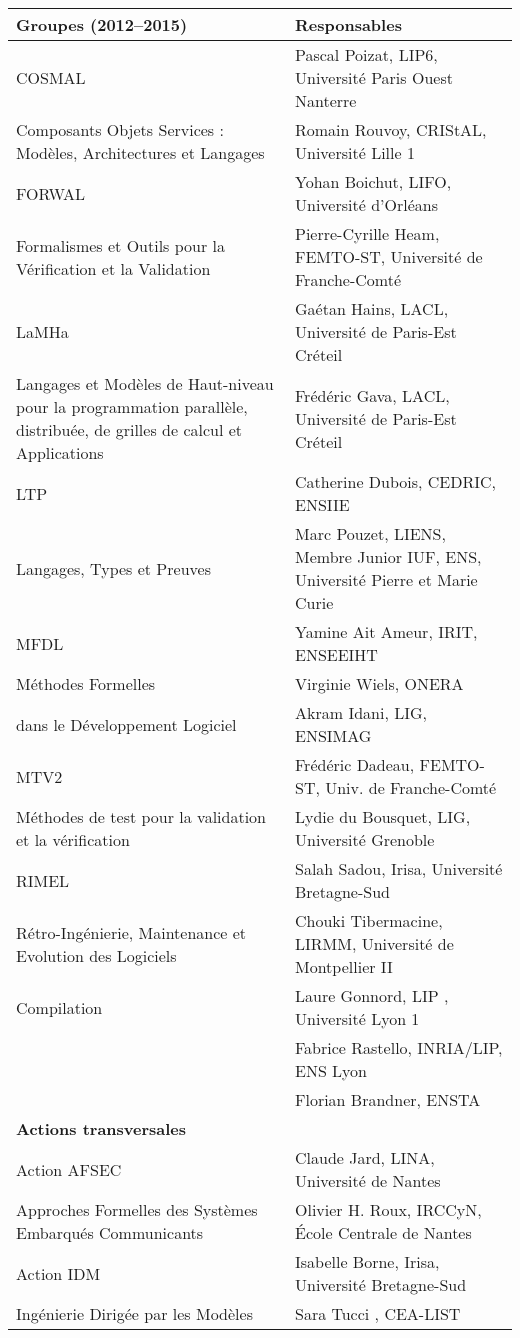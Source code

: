 \documentclass[11pt]{article}
\begin{document}
{	\centering
\begin{tabular}{|p{6cm}p{8.5cm}|}
\hline
\bf Groupes (2012--2015) & \bf Responsables \\
\hline
COSMAL & Pascal Poizat, LIP6, Université Paris Ouest Nanterre \\
\footnotesize Composants Objets Services : Modèles, Architectures et Langages  & Romain Rouvoy, CRIStAL, Université Lille 1\\

FORWAL & Yohan Boichut, LIFO, Université d'Orléans\\
\footnotesize  Formalismes et Outils pour la Vérification et la Validation  & Pierre-Cyrille Heam, FEMTO-ST, Université de Franche-Comté \\

LaMHa & Gaétan Hains, LACL, Université de Paris-Est Créteil \\
\footnotesize Langages et Modèles de Haut-niveau pour la programmation parallèle, distribuée, de grilles de calcul et Applications & Frédéric Gava, LACL, Université de Paris-Est Créteil \\

LTP & Catherine Dubois, CEDRIC, ENSIIE\\
\footnotesize Langages, Types et Preuves & Marc Pouzet, LIENS, Membre Junior IUF, ENS, Université Pierre et Marie Curie\\

MFDL & Yamine Ait Ameur, IRIT, ENSEEIHT\\
\footnotesize  Méthodes Formelles  & Virginie Wiels, ONERA  \\
\footnotesize  dans le Développement Logiciel & Akram Idani, LIG, ENSIMAG\\


MTV2 & Frédéric Dadeau, FEMTO-ST, Univ. de Franche-Comté \\
\footnotesize Méthodes de test pour la validation et la vérification  & Lydie du Bousquet, LIG, Université Grenoble\\

RIMEL & Salah Sadou, Irisa, Université Bretagne-Sud\\
\footnotesize Rétro-Ingénierie, Maintenance et Evolution des Logiciels
& Chouki Tibermacine, LIRMM, Université de Montpellier II \\

Compilation & Laure Gonnord, LIP , Université Lyon 1\\
&  Fabrice Rastello, INRIA/LIP, ENS Lyon \\
& Florian Brandner, ENSTA \\

\hline 
\textbf{Actions transversales}&\\
\hline 
Action AFSEC & Claude Jard, LINA, Université de Nantes\\
\footnotesize Approches Formelles des Systèmes Embarqués Communicants &Olivier H. Roux, IRCCyN, École Centrale de Nantes \\
Action IDM & Isabelle Borne, Irisa, Université Bretagne-Sud\\
\footnotesize Ingénierie Dirigée par les Modèles& Sara Tucci , CEA-LIST\\

\hline
		\end{tabular}
}
\end{document}
